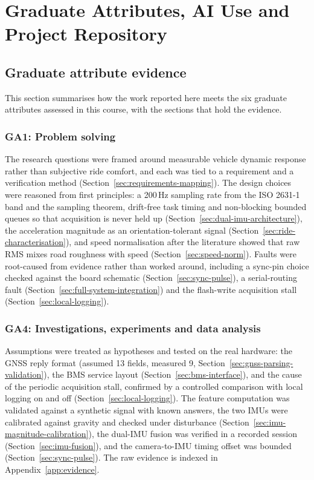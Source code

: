\chapter{Graduate Attributes, AI Use and Project Repository}

\section{Graduate attribute evidence}
\label{app:ga}

This section summarises how the work reported here meets the six graduate attributes assessed in this course, with the sections that hold the evidence.

\subsection*{GA1: Problem solving}
The research questions were framed around measurable vehicle dynamic response rather than subjective ride comfort, and each was tied to a requirement and a verification method (Section~\ref{sec:requirements-mapping}). The design choices were reasoned from first principles: a 200\,Hz sampling rate from the ISO 2631-1 band and the sampling theorem, drift-free task timing and non-blocking bounded queues so that acquisition is never held up (Section~\ref{sec:dual-imu-architecture}), the acceleration magnitude as an orientation-tolerant signal (Section~\ref{sec:ride-characterisation}), and speed normalisation after the literature showed that raw RMS mixes road roughness with speed (Section~\ref{sec:speed-norm}). Faults were root-caused from evidence rather than worked around, including a sync-pin choice checked against the board schematic (Section~\ref{sec:sync-pulse}), a serial-routing fault (Section~\ref{sec:full-system-integration}) and the flash-write acquisition stall (Section~\ref{sec:local-logging}).

\subsection*{GA4: Investigations, experiments and data analysis}
Assumptions were treated as hypotheses and tested on the real hardware: the GNSS reply format (assumed 13 fields, measured 9, Section~\ref{sec:gnss-parsing-validation}), the BMS service layout (Section~\ref{sec:bms-interface}), and the cause of the periodic acquisition stall, confirmed by a controlled comparison with local logging on and off (Section~\ref{sec:local-logging}). The feature computation was validated against a synthetic signal with known answers, the two IMUs were calibrated against gravity and checked under disturbance (Section~\ref{sec:imu-magnitude-calibration}), the dual-IMU fusion was verified in a recorded session (Section~\ref{sec:imu-fusion}), and the camera-to-IMU timing offset was bounded (Section~\ref{sec:sync-pulse}). The raw evidence is indexed in Appendix~\ref{app:evidence}.

